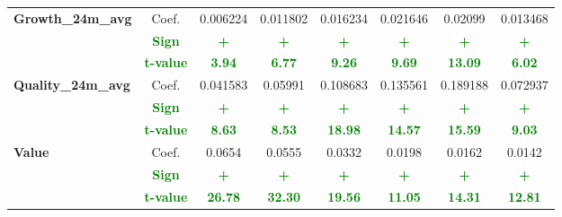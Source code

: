 \documentclass[11pt,english,a4paper,hidelinks]{book}
\begin{document}
\begin{table}[H]
{\begin{tabular}{lccccccc}
        \midrule
        \multirow{3}{*}{\textbf{Growth\_24m\_avg}}
            & Coef.   & 0.006224  & 0.011802  & 0.016234  & 0.021646  & 0.02099   & 0.013468  \\
            & \textbf{\textcolor{green}{Sign}}
                     & \textbf{\textcolor{green}{+}}
                     & \textbf{\textcolor{green}{+}}
                     & \textbf{\textcolor{green}{+}}
                     & \textbf{\textcolor{green}{+}}
                     & \textbf{\textcolor{green}{+}}
                     & \textbf{\textcolor{green}{+}} \\
            & \textbf{\textcolor{green}{t-value}}
                     & \textbf{\textcolor{green}{3.94}}
                     & \textbf{\textcolor{green}{6.77}}
                     & \textbf{\textcolor{green}{9.26}}
                     & \textbf{\textcolor{green}{9.69}}
                     & \textbf{\textcolor{green}{13.09}}
                     & \textbf{\textcolor{green}{6.02}} \\
        \midrule
        \multirow{3}{*}{\textbf{Quality\_24m\_avg}}
            & Coef.   & 0.041583  & 0.05991   & 0.108683  & 0.135561  & 0.189188  & 0.072937  \\
            & \textbf{\textcolor{green}{Sign}}
                     & \textbf{\textcolor{green}{+}}
                     & \textbf{\textcolor{green}{+}}
                     & \textbf{\textcolor{green}{+}}
                     & \textbf{\textcolor{green}{+}}
                     & \textbf{\textcolor{green}{+}}
                     & \textbf{\textcolor{green}{+}} \\
            & \textbf{\textcolor{green}{t-value}}
                     & \textbf{\textcolor{green}{8.63}}
                     & \textbf{\textcolor{green}{8.53}}
                     & \textbf{\textcolor{green}{18.98}}
                     & \textbf{\textcolor{green}{14.57}}
                     & \textbf{\textcolor{green}{15.59}}
                     & \textbf{\textcolor{green}{9.03}} \\
        \midrule
        \multirow{3}{*}{\textbf{Value}} 
            & Coef.   & 0.0654  & 0.0555  & 0.0332  & 0.0198  & 0.0162  & 0.0142 \\
            & \textbf{\textcolor{green}{Sign}}    & \textbf{\textcolor{green}{+}}       & \textbf{\textcolor{green}{+}}       & \textbf{\textcolor{green}{+}}       & \textbf{\textcolor{green}{+}}       & \textbf{\textcolor{green}{+}}       & \textbf{\textcolor{green}{+}}      \\
            & \textbf{\textcolor{green}{t-value}} & \textbf{\textcolor{green}{26.78}}   & \textbf{\textcolor{green}{32.30}}   & \textbf{\textcolor{green}{19.56}}   & \textbf{\textcolor{green}{11.05}}   & \textbf{\textcolor{green}{14.31}}   & \textbf{\textcolor{green}{12.81}}  \\
        \bottomrule
    \end{tabular}}
    \label{tab:third_linear_regression_results_scores}
\end{table}
\end{document}
